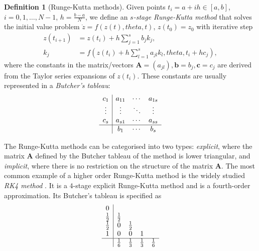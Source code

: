\documentclass[a4paper,11pt,titlepage]{article}
\def\theta{theta}%
\theoremstyle{definition}
\newtheorem{definition}{Definition}[section]
\theoremstyle{plain}
\theoremstyle{remark}
\begin{document}
\begin{definition}[Runge-Kutta methods]
    Given points $t_i = a + ih \in \left[a, b\right]$, $i = 0, 1, \dots, N - 1$, $h = \frac{b-a}{N}$, we define an $s$\textit{-stage Runge-Kutta method} that solves the initial value problem $\dot{z}= f(z(t), \theta,t)$, $z(t_0) = z_0$ with iterative step
    \begin{align*}
        z(t_{i+1}) &= z(t_i) + h\sum_{j=1}^s b_j k_j, \\
        k_j &= f\left(z(t_i) + h\sum_{l=1}^s a_{jl}k_l, \theta, t_i + hc_j\right),
    \end{align*}
    where the constants in the matrix/vectors $\mathbf{A} = (a_{jl}), \mathbf{b} = b_j, \mathbf{c} = c_j$ are derived from the Taylor series expansions of $z(t_i)$. These constants are usually represented in a \textit{Butcher's tableau}:
    \begin{equation*}
        \begin{array}{c|ccc}
            c_1 & a_{11} & \cdots & a_{1s} \\
            \vdots & \vdots & \ddots & \vdots  \\
            c_s & a_{s1} & \cdots & a_{ss} \\
            \hline
            & b_1 & \cdots & b_s
        \end{array}
    \end{equation*}
\end{definition}

The Runge-Kutta methods can be categorised into two types: \textit{explicit}, where the matrix $\mathbf{A}$ defined by the Butcher tableau of the method is lower triangular, and \textit{implicit}, where there is no restriction on the structure of the matrix $\mathbf{A}$. The most common example of a higher order Runge-Kutta method is the widely studied \textit{RK4 method} \cite{rungekuttasolvers}. It is a $4$-stage explicit Runge-Kutta method and is a fourth-order approximation. Its Butcher's tableau is specified as
\begin{equation*}
    \begin{array}{c|cccc}
        0  \\
        \frac{1}{2} & \frac{1}{2} \\
        \frac{1}{2} & 0 & \frac{1}{2} \\
        1 & 0 & 0 & 1 \\
        \hline
        & \frac{1}{6} & \frac{1}{3} & \frac{1}{3} & \frac{1}{6} \\
    \end{array}
\end{equation*}
\end{document}
